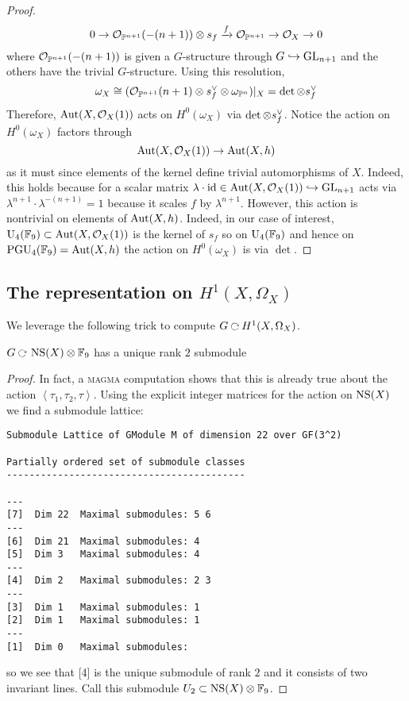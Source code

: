 \documentclass[12pt]{article}
\begin{document}
\begin{proof}
\[ 0 \to \mathcal{O}_{\mathbb{P}^{n+1}}(-(n+1)) \otimes s_f \xrightarrow{f} \mathcal{O}_{\mathbb{P}^{n+1}} \to \mathcal{O}_{X} \to 0 \]
where $\mathcal{O}_{\mathbb{P}^{n+1}}(-(n+1))$ is given a $G$-structure through $G \hookrightarrow \mathrm{GL}_{n+1}$ and the others have the trivial $G$-structure.  Using this resolution,
\[ \omega_X \cong (\mathcal{O}_{\mathbb{P}^{n+1}}(n+1) \otimes s_f^{\vee} \otimes \omega_{\mathbb{P}^{n}})|_X = \det \otimes s_f^{\vee} \]
Therefore, $\mathrm{Aut}(X, \mathcal{O}_{X}(1))$ acts on $H^0(\omega_X)$ via $\det \otimes s_f^{\vee}$. Notice the action on $H^0(\omega_X)$ factors through 
\[ \mathrm{Aut}(X, \mathcal{O}_{X}(1)) \to \mathrm{Aut}(X, h) \]
as it must since elements of the kernel define trivial automorphisms of $X$. Indeed, this holds because for a scalar matrix $\lambda \cdot \mathrm{id} \in \mathrm{Aut}(X, \mathcal{O}_{X}(1)) \hookrightarrow \mathrm{GL}_{n+1}$ acts via $\lambda^{n+1} \cdot \lambda^{-(n+1)} = 1$ because it scales $f$ by $\lambda^{n+1}$. However, this action is nontrivial on elements of $\mathrm{Aut}(X, h)$. Indeed, in our case of interest, $\mathrm{U}_4(\mathbb{F}_9) \subset \mathrm{Aut}(X, \mathcal{O}_{X}(1))$ is the kernel of $s_f$ so on $\mathrm{U}_4(\mathbb{F}_9)$ and hence on $\mathrm{PGU}_4(\mathbb{F}_9) = \mathrm{Aut}(X, h)$ the action on $H^0(\omega_X)$ is via $\det$. 
\end{proof}


\subsection{The representation on $H^1(X, \Omega_X)$}

\newcommand{\magma}{\textsc{magma}\xspace}

We leverage the following trick to compute $G \acts H^1(X, \Omega_X)$.

\begin{lemma}
$G \acts \NS(X) \ot \FF_9$ has a unique rank $2$ submodule
\end{lemma}

\begin{proof}
In fact, a \magma computation shows that this is already true about the action $\left< \tau_1, \tau_2, \tau \right>$. Using the explicit integer matrices for the action on $\operatorname{\mathrm{NS}}(X)$ we find a submodule lattice:
\begin{verbatim}
Submodule Lattice of GModule M of dimension 22 over GF(3^2)

Partially ordered set of submodule classes
------------------------------------------

---
[7]  Dim 22  Maximal submodules: 5 6
---
[6]  Dim 21  Maximal submodules: 4
[5]  Dim 3   Maximal submodules: 4
---
[4]  Dim 2   Maximal submodules: 2 3
---
[3]  Dim 1   Maximal submodules: 1
[2]  Dim 1   Maximal submodules: 1
---
[1]  Dim 0   Maximal submodules:
\end{verbatim}
so we see that [4] is the unique submodule of rank $2$ and it consists of two invariant lines. Call this submodule $U_2 \subset \operatorname{\mathrm{NS}}(X) \otimes \mathbb{F}_9$. 
\end{proof}
\end{document}
